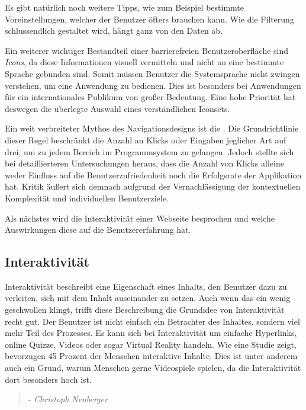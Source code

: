 Es gibt natürlich noch weitere  Tipps, wie zum Beispiel bestimmte Voreinstellungen, welcher der Benutzer öfters brauchen kann. Wie die Filterung schlussendlich gestaltet wird, hängt ganz von den Daten ab. \cite{filter2023vassilatos}

Ein weiterer wichtiger Bestandteil einer barrierefreien Benutzeroberfläche sind \emph{Icons}, da diese Informationen visuell vermitteln und nicht an eine bestimmte Sprache gebunden sind. Somit müssen Benutzer die Systemsprache nicht zwingen verstehen, um eine Anwendung zu bedienen. Dies ist besonders bei Anwendungen für ein internationales Publikum von großer Bedeutung. Eine hohe Priorität hat deswegen die überlegte Auswahl eines verständlichen Iconsets. \cite{icons2024hahn}

Ein weit verbreiteter Mythos des Navigationsdesigns ist die . Die Grundrichtlinie dieser Regel beschränkt die Anzahl an Klicks oder Eingaben jeglicher Art auf drei, um zu jedem Bereich im Programmsystem zu gelangen. Jedoch stellte sich bei detaillierteren Untersuchungen heraus, dass die Anzahl von Klicks alleine weder Einfluss auf die Benutzerzufriedenheit noch die Erfolgsrate der Applikation hat. Kritik äußert sich demnach aufgrund der Vernachlässigung der kontextuellen Komplexität und individuellen Benutzerziele. \cite{laubheimer2019myth,wright2010myth}

Als nächstes wird die Interaktivität einer Webseite besprochen und welche Auswirkungen diese auf die Benutzererfahrung hat.

\subsection{Interaktivität}

Interaktivität beschreibt eine Eigenschaft eines Inhalts, den Benutzer dazu zu verleiten, sich mit dem Inhalt auseinander zu setzen. Auch wenn das ein wenig geschwollen klingt, trifft diese Beschreibung die Grundidee von Interaktivität recht gut. Der Benutzer ist nicht einfach ein Betrachter des Inhaltes, sondern viel mehr Teil des Prozesses. Es kann sich bei Interaktivität um einfache Hyperlinks, online Quizze, Videos oder sogar Virtual Reality handeln. Wie eine Studie zeigt, bevorzugen 45 Prozent der Menschen interaktive Inhalte. Dies ist unter anderem auch ein Grund, warum Menschen gerne Videospiele spielen, da die Interaktivität dort besonders hoch ist. \cite{interactive2020Ediger}

\begin{quote}
     - \textit{Christoph Neuberger}
    \cite{neuberger2007interaktivitat}
\end{quote}

